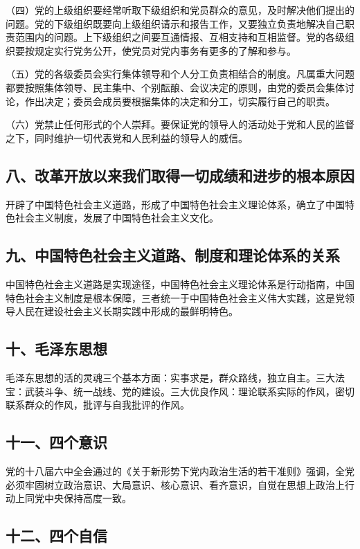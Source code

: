\documentclass[UTF8,11pt,a4paper]{ctexart}
\begin{document}
\noindent （四）党的上级组织要经常听取下级组织和党员群众的意见，及时解决他们提出的问题。党的下级组织既要向上级组织请示和报告工作，又要独立负责地解决自己职责范围内的问题。上下级组织之间要互通情报、互相支持和互相监督。党的各级组织要按规定实行党务公开，使党员对党内事务有更多的了解和参与。

\noindent （五）党的各级委员会实行集体领导和个人分工负责相结合的制度。凡属重大问题都要按照集体领导、民主集中、个别酝酿、会议决定的原则，由党的委员会集体讨论，作出决定；委员会成员要根据集体的决定和分工，切实履行自己的职责。

\noindent （六）党禁止任何形式的个人崇拜。要保证党的领导人的活动处于党和人民的监督之下，同时维护一切代表党和人民利益的领导人的威信。

\subsection*{八、改革开放以来我们取得一切成绩和进步的根本原因}

开辟了中国特色社会主义道路，形成了中国特色社会主义理论体系，确立了中国特色社会主义制度，发展了中国特色社会主义文化。

\subsection*{九、中国特色社会主义道路、制度和理论体系的关系}

中国特色社会主义道路是实现途径，中国特色社会主义理论体系是行动指南，中国特色社会主义制度是根本保障，三者统一于中国特色社会主义伟大实践，这是党领导人民在建设社会主义长期实践中形成的最鲜明特色。

\subsection*{十、毛泽东思想}

毛泽东思想的活的灵魂三个基本方面：实事求是，群众路线，独立自主。三大法宝：武装斗争、统一战线、党的建设。三大优良作风：理论联系实际的作风，密切联系群众的作风，批评与自我批评的作风。

\subsection*{十一、四个意识}

党的十八届六中全会通过的《关于新形势下党内政治生活的若干准则》强调，全党必须牢固树立政治意识、大局意识、核心意识、看齐意识，自觉在思想上政治上行动上同党中央保持高度一致。

\subsection*{十二、四个自信}
\end{document}
